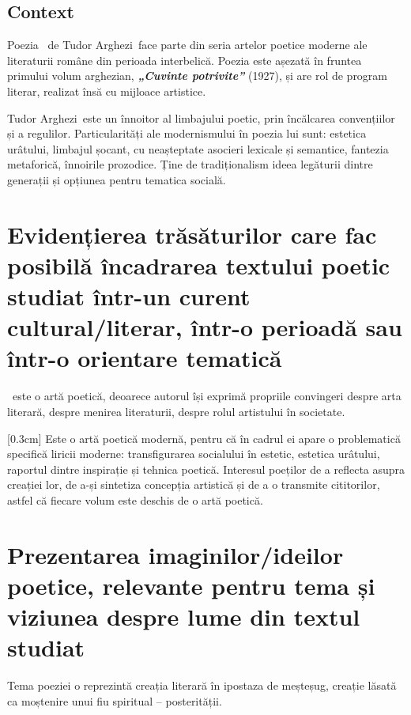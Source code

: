 \renewcommand{\operatitle}{\textbfit{„Testament”}} %
\renewcommand{\operaauthor}{Tudor Arghezi} %


\subsection{Context}

Poezia \operatitle\ de \operaauthor\ face parte din seria artelor poetice moderne ale literaturii române din perioada interbelică. Poezia este așezată în fruntea primului volum arghezian, \textbf{\textit{„Cuvinte potrivite”}} (1927), și are rol de program literar, realizat însă cu mijloace artistice.

\operaauthor\ este un înnoitor al limbajului poetic, prin încălcarea convențiilor și a regulilor. Particularități ale modernismului în poezia lui sunt: estetica urâtului, limbajul șocant, cu neașteptate asocieri lexicale și semantice, fantezia metaforică, înnoirile prozodice. Ține de tradiționalism ideea legăturii dintre generații și opțiunea pentru tematica socială.


\section{Evidențierea trăsăturilor care fac posibilă încadrarea textului poetic studiat într-un curent cultural/literar, într-o perioadă sau într-o orientare tematică}

\operatitle\ este o artă poetică, deoarece autorul își exprimă propriile convingeri despre arta literară, despre menirea literaturii, despre rolul artistului în societate.

[0.3cm]
Este o artă poetică modernă, pentru că în cadrul ei apare o problematică specifică liricii moderne: transfigurarea socialului în estetic, estetica urâtului, raportul dintre inspirație și tehnica poetică. Interesul poeților de a reflecta asupra creației lor, de a-și sintetiza concepția artistică și de a o transmite cititorilor, astfel că fiecare volum este deschis de o artă poetică.


\section{Prezentarea imaginilor/ideilor poetice, relevante pentru te\-ma și viziunea despre lume din textul studiat}

Tema poeziei o reprezintă creația literară în ipostaza de meșteșug, creație lăsată ca moștenire unui fiu spiritual -- posterității.

